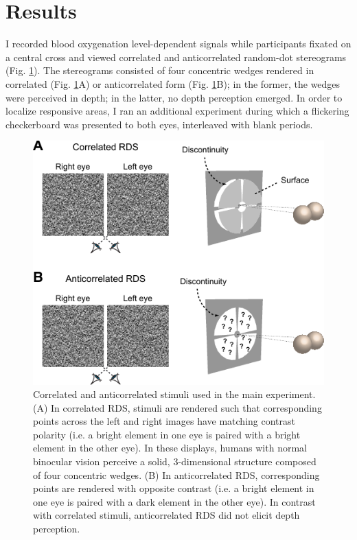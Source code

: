 \section{Results}
I recorded blood oxygenation level-dependent signals while participants fixated on a central cross and viewed correlated and anticorrelated random-dot stereograms (Fig. \ref{fig:ch5fig1}). The stereograms consisted of four concentric wedges rendered in correlated (Fig. \ref{fig:ch5fig1}A) or anticorrelated form (Fig. \ref{fig:ch5fig1}B); in the former, the wedges were perceived in depth; in the latter, no depth perception emerged. In order to localize responsive areas, I ran an additional experiment during which a flickering checkerboard was presented to both eyes, interleaved with blank periods.

\begin{figure}
  \centering
  \includegraphics[keepaspectratio]{Fig1.pdf}
  \caption[Correlated and anticorrelated RDS stimuli.]{Correlated and anticorrelated stimuli used in the main experiment. (A) In correlated RDS, stimuli are rendered such that corresponding points across the left and right images have matching contrast polarity (i.e. a bright element in one eye is paired with a bright element in the other eye). In these displays, humans with normal binocular vision perceive a solid, 3-dimensional structure composed of four concentric wedges. (B) In anticorrelated RDS, corresponding points are rendered with opposite contrast (i.e. a bright element in one eye is paired with a dark element in the other eye). In contrast with correlated stimuli, anticorrelated RDS did not elicit depth perception.}
  \label{fig:ch5fig1}
\end{figure}

